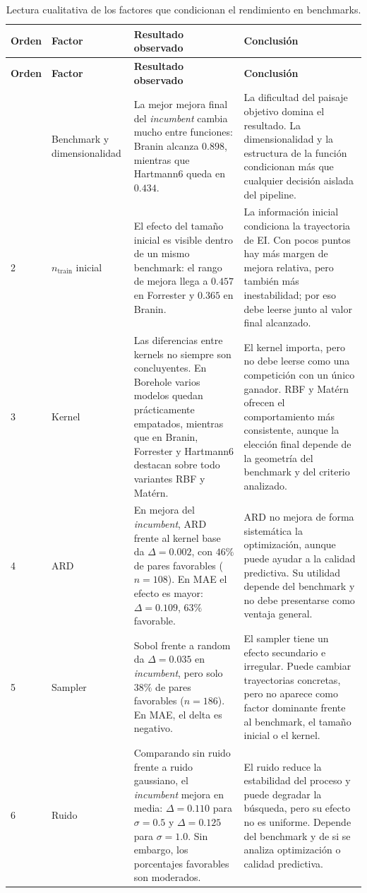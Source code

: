 \protect{}\label{tab:jerarquia_factores_benchmark}
\begin{longtable}[]{@{}llll@{}}
\caption{Lectura cualitativa de los factores que condicionan el rendimiento en benchmarks.}\tabularnewline
\toprule\noalign{}
\textbf{Orden} & \textbf{Factor} & \textbf{Resultado observado} & \textbf{Conclusión} \\
\midrule\noalign{}
\endfirsthead
\toprule\noalign{}
\textbf{Orden} & \textbf{Factor} & \textbf{Resultado observado} & \textbf{Conclusión} \\
\midrule\noalign{}
\endhead
\bottomrule\noalign{}
\endlastfoot
1 & Benchmark y dimensionalidad & La mejor mejora final del \emph{incumbent} cambia mucho entre funciones: Branin alcanza \(0.898\), mientras que Hartmann6 queda en \(0.434\). & La dificultad del paisaje objetivo domina el resultado. La dimensionalidad y la estructura de la función condicionan más que cualquier decisión aislada del pipeline. \\
2 & \(n_{\text{train}}\) inicial & El efecto del tamaño inicial es visible dentro de un mismo benchmark: el rango de mejora llega a \(0.457\) en Forrester y \(0.365\) en Branin. & La información inicial condiciona la trayectoria de EI. Con pocos puntos hay más margen de mejora relativa, pero también más inestabilidad; por eso debe leerse junto al valor final alcanzado. \\
3 & Kernel & Las diferencias entre kernels no siempre son concluyentes. En Borehole varios modelos quedan prácticamente empatados, mientras que en Branin, Forrester y Hartmann6 destacan sobre todo variantes RBF y Matérn. & El kernel importa, pero no debe leerse como una competición con un único ganador. RBF y Matérn ofrecen el comportamiento más consistente, aunque la elección final depende de la geometría del benchmark y del criterio analizado. \\
4 & ARD & En mejora del \emph{incumbent}, ARD frente al kernel base da \(\Delta=0.002\), con \(46\%\) de pares favorables (\(n=108\)). En MAE el efecto es mayor: \(\Delta=0.109\), \(63\%\) favorable. & ARD no mejora de forma sistemática la optimización, aunque puede ayudar a la calidad predictiva. Su utilidad depende del benchmark y no debe presentarse como ventaja general. \\
5 & Sampler & Sobol frente a random da \(\Delta=0.035\) en \emph{incumbent}, pero solo \(38\%\) de pares favorables (\(n=186\)). En MAE, el delta es negativo. & El sampler tiene un efecto secundario e irregular. Puede cambiar trayectorias concretas, pero no aparece como factor dominante frente al benchmark, el tamaño inicial o el kernel. \\
6 & Ruido & Comparando sin ruido frente a ruido gaussiano, el \emph{incumbent} mejora en media: \(\Delta=0.110\) para \(\sigma=0.5\) y \(\Delta=0.125\) para \(\sigma=1.0\). Sin embargo, los porcentajes favorables son moderados. & El ruido reduce la estabilidad del proceso y puede degradar la búsqueda, pero su efecto no es uniforme. Depende del benchmark y de si se analiza optimización o calidad predictiva. \\
\end{longtable}

